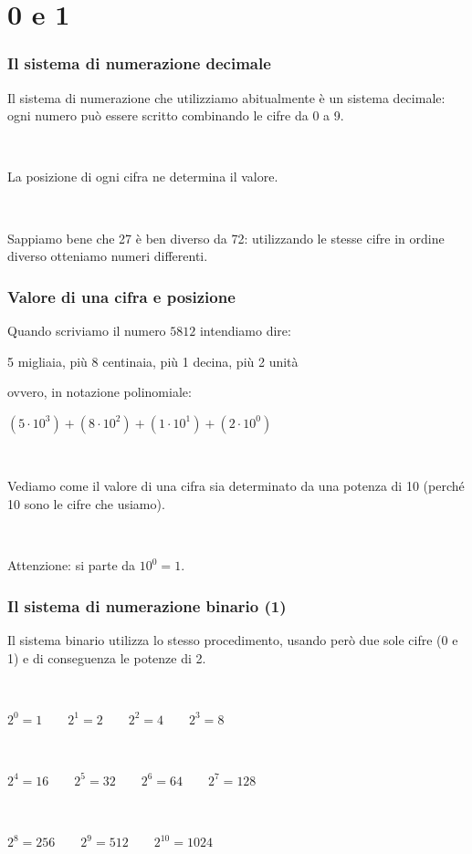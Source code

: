 \documentclass[handout]{beamer}
\begin{document}
\section{0 e 1}


\begin{frame}
\frametitle{Il sistema di numerazione decimale}
Il sistema di numerazione che utilizziamo abitualmente è un sistema decimale: ogni numero può essere scritto combinando le cifre da 0 a 9.\pause

~

La \alert<2>{posizione} di ogni cifra ne determina il valore.\pause

~

Sappiamo bene che 27 è ben diverso da 72: utilizzando le stesse cifre in ordine diverso otteniamo numeri differenti.
\end{frame}


\begin{frame}
\frametitle{Valore di una cifra e posizione}
Quando scriviamo il numero $ 5812 $ intendiamo dire:
\begin{center}
  5 migliaia, più 8 centinaia, più 1 decina, più 2 unità\pause
\end{center}
ovvero, in \alert<2>{notazione polinomiale}:
\begin{center}
  $ (5 \cdot 10^3) + (8 \cdot 10^2) + (1 \cdot 10^1) + (2 \cdot 10^0) $
\end{center}\pause

~

Vediamo come il valore di una cifra sia determinato da una \alert<3>{potenza di 10} (perché 10 sono le cifre che usiamo).\pause

~

\alert<4>{Attenzione:} si parte da $ 10^0 = 1 $.
\end{frame}



\begin{frame}
\frametitle{Il sistema di numerazione binario (1)}
Il sistema binario utilizza lo stesso procedimento, usando però \alert<1>{due sole cifre (0 e 1)} e di conseguenza le \alert<1-2>{potenze di 2}.\pause

~

\begin{center}
  $ 2^0=1 \qquad 2^1=2 \qquad 2^2=4 \qquad 2^3= 8 $

  ~

  $ 2^4=16 \qquad 2^5=32 \qquad 2^6=64 \qquad 2^7=128 $

  ~

  $ 2^8=256 \qquad 2^9=512 \qquad 2^{10}=1024 $

  ~

  \href{https://play2048.co/}{}
\end{center}
\end{frame}
\end{document}

